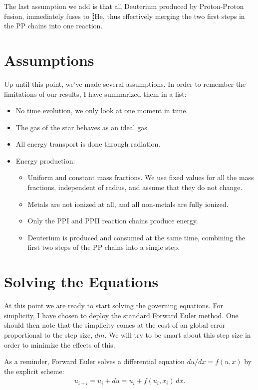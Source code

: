 \documentclass[11pt,twocolumn]{article}
\begin{document}
The last assumption we add is that all Deuterium produced by
Proton-Proton fusion, immediately fuses to $^3_2\text{He}$, thus
effectively merging the two first steps in the PP chains into one
reaction.


\section{Assumptions}
Up until this point, we've made several assumptions. In order to
remember the limitations of our results, I have summarized them in a
list:

\begin{itemize}
  \item No time evolution, we only look at one moment in time.
  \item The gas of the star behaves as an ideal gas.
  \item All energy transport is done through radiation.
  \item Energy production:
    \begin{itemize}
    \item Uniform and constant mass fractions. We use fixed values for 
      all the mass fractions, independent of radius, and assume that
      they do not change.
    \item Metals are not ionized at all, and all non-metals are fully
      ionized.
    \item Only the PPI and PPII reaction chains produce energy.
    \item Deuterium is produced and consumed at the same time,
      combining the first two steps of the PP chains into a single step.
    \end{itemize}
\end{itemize}



\section{Solving the Equations}
At this point we are ready to start solving the governing
equations. For simplicity, I have chosen to deploy the standard
Forward Euler method. One should then note that the simplicity comes
at the cost of an global error proportional to the step size, $dm$. We
will try to be smart about this step size in order to minimize the
effects of this. 

As a reminder, Forward Euler solves a differential equation $du/dx =
f(u,x)$ by the explicit scheme: 
\begin{align*}
  u_{i+i} = u_i + du = u_i + f(u_i,x_i)\,dx.
\end{align*}
\end{document}

